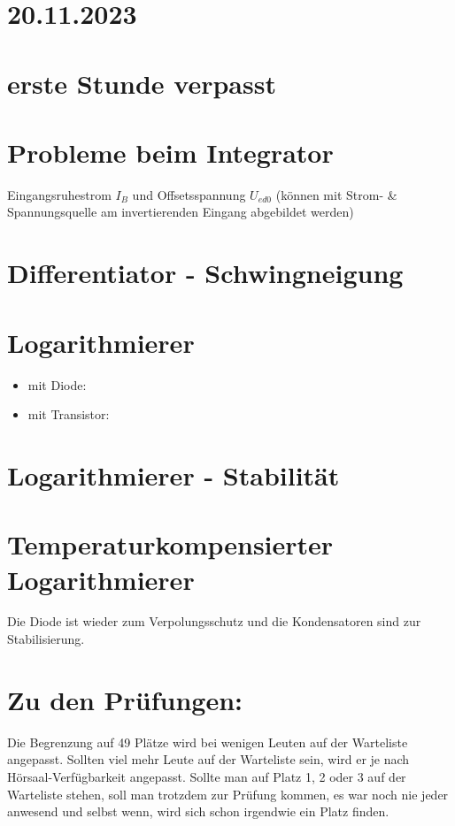 \documentclass[a5paper]{article}
\begin{document}
\section*{20.11.2023}
\section*{erste Stunde verpasst}

\section*{Probleme beim Integrator}
Eingangsruhestrom $I_{B}$ und Offsetsspannung $ U_{ed0}$ (können mit Strom- \& Spannungsquelle am invertierenden Eingang abgebildet werden)

\section*{Differentiator - Schwingneigung}

\section*{Logarithmierer}
\begin{itemize}
    \item mit Diode:
    \item mit Transistor:
\end{itemize}

\section*{Logarithmierer - Stabilität}
\section*{Temperaturkompensierter Logarithmierer}
Die Diode ist wieder zum Verpolungsschutz und die Kondensatoren sind zur Stabilisierung.

\section*{Zu den Prüfungen:}
Die Begrenzung auf 49 Plätze wird bei wenigen Leuten auf der Warteliste angepasst. Sollten viel mehr Leute auf der Warteliste sein, wird er je nach Hörsaal-Verfügbarkeit angepasst. Sollte man auf Platz 1, 2 oder 3 auf der Warteliste stehen, soll man trotzdem zur Prüfung kommen, es war noch nie jeder anwesend und selbst wenn, wird sich schon irgendwie ein Platz finden.
\end{document}
